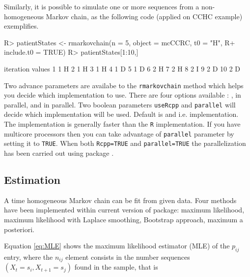 \documentclass[
  nojss]{jss}
\begin{document}
Similarly, it is possible to simulate one or more sequences from a non-homogeneous Markov chain,
as the following code (applied on CCHC example) exemplifies.

\begin{CodeChunk}

\begin{CodeInput}
R> patientStates <- rmarkovchain(n = 5, object = mcCCRC, t0 = "H", 
R+                               include.t0 = TRUE)
R> patientStates[1:10,]
\end{CodeInput}

\begin{CodeOutput}
   iteration values
1          1      H
2          1      H
3          1      H
4          1      D
5          1      D
6          2      H
7          2      H
8          2      I
9          2      D
10         2      D
\end{CodeOutput}
\end{CodeChunk}

Two advance parameters are availabe to the \texttt{rmarkovchain} method which helps you decide which implementation to use. There are four options available : ,  in parallel,  and  in parallel. Two boolean parameters \texttt{useRcpp} and \texttt{parallel} will decide which implementation will be used. Default is  and  i.e.  implementation. The  implementation is generally faster than the \texttt{R} implementation. If you have multicore processors then you can take advantage of \texttt{parallel} parameter by setting it to \texttt{TRUE}. When both \texttt{Rcpp=TRUE} and \texttt{parallel=TRUE} the parallelization has been carried out using  package \citep{pkg:RcppParallel}.

\hypertarget{estimation}{%
\subsection{Estimation}\label{estimation}}

A time homogeneous Markov chain can be fit from given data. Four methods have been implemented within current version of  package: maximum likelihood, maximum likelihood with Laplace smoothing, Bootstrap approach, maximum a posteriori.

Equation \ref{eq:MLE} shows the maximum likelihood estimator (MLE) of the \(p_{ij}\) entry, where the \(n_{ij}\) element consists in the number sequences \(\left( X_{t}=s_{i}, X_{t+1}=s_{j}\right)\) found in the sample, that is
\end{document}
